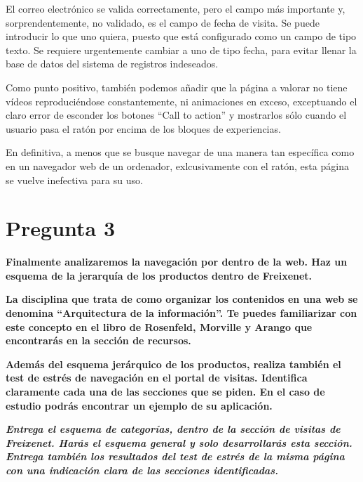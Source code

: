 \documentclass[spanish]{article}
\begin{document}
\newpage

El correo electrónico se valida correctamente, pero el campo más importante y,
sorprendentemente, no validado, es el campo de fecha de visita. Se puede
introducir lo que uno quiera, puesto que está configurado como un campo de tipo
texto. Se requiere urgentemente cambiar a uno de tipo fecha, para evitar llenar
la base de datos del sistema de registros indeseados.\newline

Como punto positivo, también podemos añadir que la página a valorar no tiene
vídeos reproduciéndose constantemente, ni animaciones en exceso, exceptuando el
claro error de esconder los botones ``Call to action'' y mostrarlos sólo cuando
el usuario pasa el ratón por encima de los bloques de experiencias.\newline

En definitiva, a menos que se busque navegar de una manera tan específica como
en un navegador web de un ordenador, exlcusivamente con el ratón, esta página se
vuelve inefectiva para su uso.\newline

\newpage

\section{Pregunta 3}

\textbf{Finalmente analizaremos la navegación por dentro de la web. Haz un
esquema de la jerarquía de los productos dentro de Freixenet.}\newline

\textbf{La disciplina que trata de como organizar los contenidos en una web se
denomina ``Arquitectura de la información''. Te puedes familiarizar con este
concepto en el libro de Rosenfeld, Morville y Arango que encontrarás en la
sección de recursos.}\newline

\textbf{Además del esquema jerárquico de los productos, realiza también el test
de estrés de navegación en el portal de visitas. Identifica claramente cada una
de las secciones que se piden. En el caso de estudio podrás encontrar un ejemplo
de su aplicación.}\newline

\textbf{\textit{Entrega el esquema de categorías, dentro de la sección de
visitas de Freixenet. Harás el esquema general y solo desarrollarás esta
sección. Entrega también los resultados del test de estrés de la misma página
con una indicación clara de las secciones identificadas.}}\newline
\end{document}
